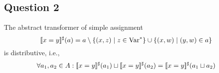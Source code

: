 \subsection{Question 2}
The abstract transformer of simple assignment
\begin{equation*}
	[\![x=y]\!]^\sharp(a) = a \setminus \{(x,z) \mid z\in \text{Var}^*\}\cup\{(x,w)\mid(y,w)\in a\}
\end{equation*}
is distributive, i.e.,
\begin{equation*}
	\forall a_1,a_2\in A: [\![x=y]\!]^\sharp(a_1)\sqcup[\![x=y]\!]^\sharp(a_2)=[\![x=y]\!]^\sharp(a_1\sqcup a_2)
\end{equation*}